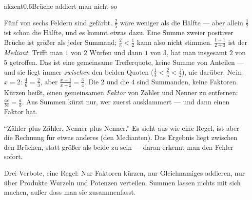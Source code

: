 \begin{loesungkarte}{akzent}{0.6}{Brüche addiert man nicht so}
\begin{center}
\end{center}
Fünf von sechs Feldern sind gefärbt. $\frac25$ wäre weniger als die Hälfte --- aber allein $\frac12$ ist schon die Hälfte, und es kommt etwas dazu. Eine Summe zweier positiver Brüche ist größer als jeder Summand; $\frac25 < \frac12$ kann also nicht stimmen.
$\frac{1 + 1}{2 + 3}$ ist der \emph{Mediant}: Trifft man $1$ von $2$ Würfen und dann $1$ von $3$, hat man insgesamt $2$ von $5$ getroffen. Das ist eine gemeinsame Trefferquote, keine Summe von Anteilen --- und sie liegt immer \emph{zwischen} den beiden Quoten ($\frac13 < \frac25 < \frac12$), nie darüber.
Nein. $x = 2$: $\frac{4}{6} = \frac23$, aber $\frac{x + 1}{x + 2} = \frac34$. Die $2$ und die $4$ sind Summanden, keine Faktoren.
Kürzen heißt, einen gemeinsamen \emph{Faktor} von Zähler und Nenner zu entfernen: $\frac{ac}{bc} = \frac ab$. Aus Summen kürzt nur, wer zuerst ausklammert --- und dann einen Faktor hat.
\begin{fehler}\kastentext
\enquote{Zähler plus Zähler, Nenner plus Nenner.} Es sieht aus wie eine Regel, ist aber die Rechnung für etwas anderes (den Medianten). Das Ergebnis liegt zwischen den Brüchen, statt größer als beide zu sein --- daran erkennt man den Fehler sofort.
\end{fehler}
\begin{mitnehmen}\kastentext
Drei Verbote, eine Regel: Nur Faktoren kürzen, nur Gleichnamiges addieren, nur über Produkte Wurzeln und Potenzen verteilen. Summen lassen nichts mit sich machen, außer dass man sie zusammenfasst.
\end{mitnehmen}
\end{loesungkarte}


